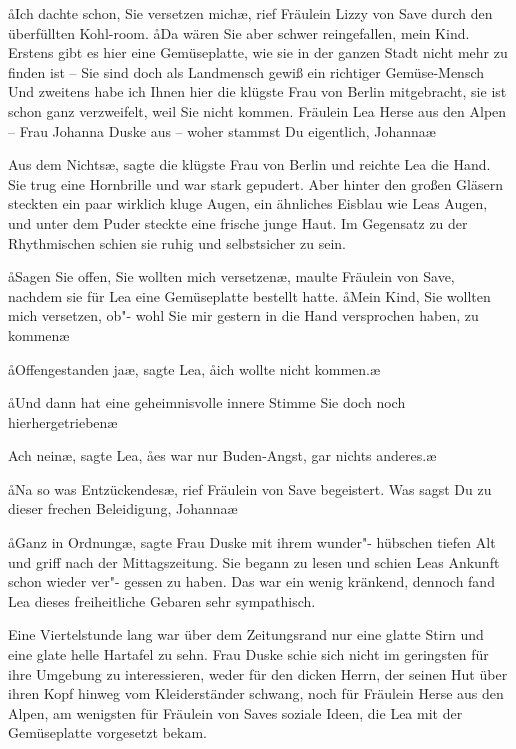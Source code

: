 \aa{}Ich dachte schon, Sie versetzen mich\ae{}, rief Fräulein Lizzy
von Save durch den überfüllten Kohl-room. \aa{}Da wären Sie
aber schwer reingefallen, mein Kind. Erstens gibt es hier eine
Gemüseplatte, wie sie in der ganzen Stadt nicht mehr zu
finden ist -- Sie sind doch als Landmensch gewiß ein richtiger
Gemüse-Mensch\frag{} Und zweitens habe ich Ihnen hier die klügste
Frau von Berlin mitgebracht, sie ist schon ganz verzweifelt,
weil Sie nicht kommen. Fräulein Lea Herse aus den Alpen --
Frau Johanna Duske aus -- woher stammst Du eigentlich,
Johanna\frag{}\ae{}

\aanah{}Aus dem Nichts\ae{}, sagte die klügste Frau von Berlin und
reichte Lea die Hand. Sie trug eine Hornbrille und war stark
gepudert. Aber hinter den großen Gläsern steckten ein paar
wirklich kluge Augen, ein ähnliches Eisblau wie Leas Augen,
und unter dem Puder steckte eine frische junge Haut. Im
Gegensatz zu der Rhythmischen schien sie ruhig und selbstsicher
zu sein.

\aa{}Sagen Sie offen, Sie wollten mich versetzen\frag{}\ae{}, maulte
Fräulein von Save, nachdem sie für Lea eine Gemüseplatte
bestellt hatte. \aa{}Mein Kind, Sie wollten mich versetzen, ob"-%
wohl Sie mir gestern in die Hand versprochen haben, zu
kommen\frag{}\ae{}

\aa{}Offengestanden ja\ae{}, sagte Lea, \aa{}ich wollte nicht kommen.\ae{}

\aa{}Und dann hat eine geheimnisvolle innere Stimme Sie doch
noch hierhergetrieben\frag{}\ae{}

\aanah{}Ach nein\ae{}, sagte Lea, \aa{}es war nur Buden-Angst, gar nichts
anderes.\ae{}

\aa{}Na so was Entzückendes\ae{}, rief Fräulein von Save begeistert.
\aanah{}Was sagst Du zu dieser frechen Beleidigung, Johanna\frag{}\ae{}

\aa{}Ganz in Ordnung\ae{}, sagte Frau Duske mit ihrem wunder"-%
hübschen tiefen Alt und griff nach der Mittagszeitung. Sie
begann zu lesen und schien Leas Ankunft schon wieder ver"-%
gessen zu haben. Das war ein wenig kränkend, dennoch fand
Lea dieses freiheitliche Gebaren sehr sympathisch.

Eine Viertelstunde lang war über dem Zeitungsrand nur eine
glatte Stirn und eine glate helle Hartafel zu sehn. Frau
Duske schie sich nicht im geringsten für ihre Umgebung zu
interessieren, weder für den dicken Herrn, der seinen Hut
über ihren Kopf hinweg vom Kleiderständer schwang, noch
für Fräulein Herse aus den Alpen, am wenigsten für Fräulein
von Saves soziale Ideen, die Lea mit der Gemüseplatte
vorgesetzt bekam.

